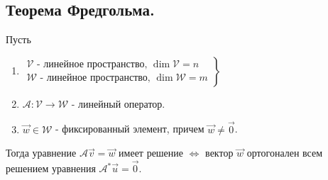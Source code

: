 \subsection{
    Теорема Фредгольма.
}


\begin{theorem}[Фредгольма] Пусть
    \begin{enumerate}
        \item $\left.\begin{array}{l}
                \mathcal{V} \text{ - линейное пространство, } \dim \mathcal{V} = n \\
                \mathcal{W} \text{ - линейное пространство, } \dim \mathcal{W} = m
            \end{array}\right\}$    
        \item $\mathscr{A} \colon \mathcal{V} \to \mathcal{W}$ - линейный оператор.
        \item $\vec{w} \in \mathcal{W}$ - фиксированный элемент, причем $\vec{w} \ne \vec{0}$.
    \end{enumerate}

    Тогда уравнение $\mathscr{A}\vec{v} = \vec{w}$ имеет решение $\iff$ вектор $\vec{w}$ ортогонален всем решением уравнения $\mathscr{A^*}\vec{u} = \vec{0}$.
\end{theorem}

